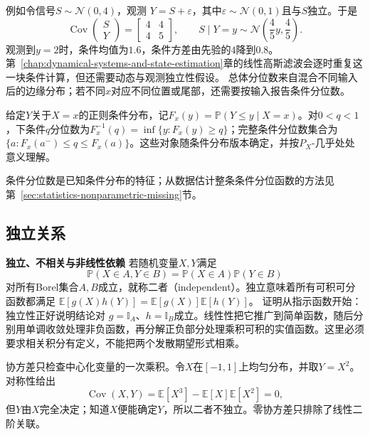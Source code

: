 例如令信号\(S\sim\mathcal{N}(0,4)\)，观测
\(Y=S+\varepsilon\)，其中\(\varepsilon\sim\mathcal{N}(0,1)\)且与\(S\)独立。于是
\[
  \operatorname{Cov}
  \begin{pmatrix}S\\Y\end{pmatrix}
  =
  \begin{bmatrix}4&4\\4&5\end{bmatrix},
  \qquad
  S\mid Y=y\sim\mathcal{N}\left(\frac45y,\frac45\right).
\]
观测到\(y=2\)时，条件均值为\(1.6\)，条件方差由先验的\(4\)降到\(0.8\)。第~\ref{chap:dynamical-systems-and-state-estimation}章的线性高斯滤波会逐时重复这一块条件计算，但还需要动态与观测独立性假设。
总体分位数来自混合不同输入后的边缘分布；若不同\(x\)对应不同位置或尾部，还需要按输入报告条件分位数。
\begin{definition}[条件分位数]
  \label{def:statistics-conditional-quantile}
给定\(Y\)关于\(X=x\)的正则条件分布，记\(F_x(y)=\mathbb P(Y\leq y\mid X=x)\)。对\(0<q<1\)，下条件\(q\)分位数为\(F_x^{-1}(q)=\inf\{y:F_x(y)\geq q\}\)；完整条件分位数集合为\(\{a:F_x(a^-)\leq q\leq F_x(a)\}\)。这些对象随条件分布版本确定，并按\(P_X\)-几乎处处意义理解。
\end{definition}
条件分位数是已知条件分布的特征；从数据估计整条条件分位函数的方法见第~\ref{sec:statistics-nonparametric-missing}节。

\subsection{独立关系}
\label{sec:probability-moments-independence}

\par\medskip\noindent\textbf{独立、不相关与非线性依赖}\quad
若随机变量\(X,Y\)满足
\[ \mathbb{P}(X\in A,Y\in B)
  =\mathbb{P}(X\in A)\mathbb{P}(Y\in B) \]
对所有Borel集合\(A,B\)成立，就称二者（independent）。独立意味着所有可积可分函数都满足
\(\mathbb{E}[g(X)h(Y)]=\mathbb{E}[g(X)]\mathbb{E}[h(Y)]\)。
证明从指示函数开始：独立性正好说明结论对
\(g=\mathbb{I}_A\)、\(h=\mathbb{I}_B\)成立。线性性把它推广到简单函数，随后分别用单调收敛处理非负函数，再分解正负部分处理乘积可积的实值函数。这里必须要求相关积分有定义，不能把两个发散期望形式相乘。

协方差只检查中心化变量的一次乘积。令\(X\)在\([-1,1]\)上均匀分布，并取\(Y=X^2\)。对称性给出
\[ \operatorname{Cov}(X,Y)
  =\mathbb{E}[X^3]-\mathbb{E}[X]\mathbb{E}[X^2]=0, \]
但\(Y\)由\(X\)完全决定；知道\(X\)便能确定\(Y\)，所以二者不独立。零协方差只排除了线性二阶关联。

